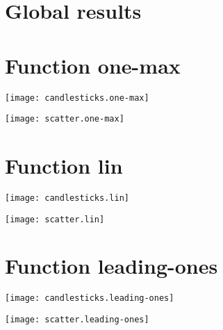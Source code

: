 \graphicspath{{../graphics/}}
\section{Global results}
\begin{center}

\end{center}
\newpage
\section{Function one-max}
\begin{center}

\end{center}
\begin{center}

\end{center}
\begin{center}
\texttt{[image: candlesticks.one-max]}
\end{center}
\begin{center}
\texttt{[image: scatter.one-max]}
\end{center}
\newpage
\section{Function lin}
\begin{center}

\end{center}
\begin{center}

\end{center}
\begin{center}
\texttt{[image: candlesticks.lin]}
\end{center}
\begin{center}
\texttt{[image: scatter.lin]}
\end{center}
\newpage
\section{Function leading-ones}
\begin{center}

\end{center}
\begin{center}

\end{center}
\begin{center}
\texttt{[image: candlesticks.leading-ones]}
\end{center}
\begin{center}
\texttt{[image: scatter.leading-ones]}
\end{center}
\newpage
